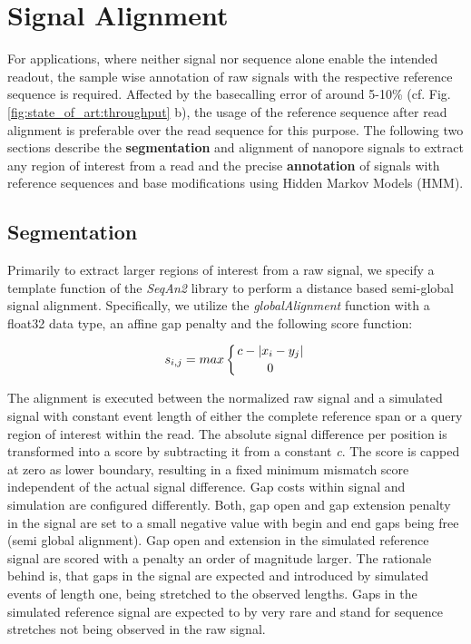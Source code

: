 \section{Signal Alignment}
\label{sec:signal:alignment}

For applications, where neither signal nor sequence alone enable the intended readout, the sample wise annotation of raw signals with the respective reference sequence is required. Affected by the basecalling error of around 5-10\% (cf. Fig. \ref{fig:state_of_art:throughput} b), the usage of the reference sequence after read alignment is preferable over the read sequence for this purpose. The following two sections describe the \textbf{segmentation} and alignment of nanopore signals to extract any region of interest from a read and the precise \textbf{annotation} of signals with reference sequences and base modifications using Hidden Markov Models (HMM).



\subsection{Segmentation}
\label{subsec:signal:segmentation}

Primarily to extract larger regions of interest from a raw signal, we specify a template function of the \textit{SeqAn2} \cite{Reinert2017} library to perform a distance based semi-global signal alignment. Specifically, we utilize the \textit{globalAlignment} function with a float32 data type, an affine gap penalty and the following score function:

\begin{equation}
s_{i,j} = max \left\lbrace c - \left| x_{i} - y_{j} \right| \atop 0 \right.
\end{equation}

The alignment is executed between the normalized raw signal and a simulated signal with constant event length of either the complete reference span or a query region of interest within the read.
The absolute signal difference per position is transformed into a score by subtracting it from a constant \textit{c}. The score is capped at zero as lower boundary, resulting in a fixed minimum mismatch score independent of the actual signal difference.
Gap costs within signal and simulation are configured differently. 
Both, gap open and gap extension penalty in the signal are set to a small negative value with begin and end gaps being free (semi global alignment). Gap open and extension in the simulated reference signal are scored with a penalty an order of magnitude larger. 
The rationale behind is, that gaps in the signal are expected and introduced by simulated events of length one, being stretched to the observed lengths. Gaps in the simulated reference signal are expected to by very rare and stand for sequence stretches not being observed in the raw signal.

